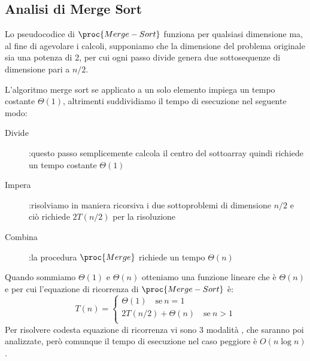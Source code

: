 \subsection{Analisi di Merge Sort}
Lo pseudocodice di $\proc{Merge-Sort}$ funziona per qualsiasi dimensione ma, al fine
di agevolare i calcoli, supponiamo che la dimensione del problema originale sia una
potenza di 2, per cui ogni passo divide genera due sottosequenze di dimensione pari a $n/2$.

L'algoritmo merge sort se applicato a un solo elemento impiega un tempo costante $\Theta(1)$,
altrimenti suddividiamo il tempo di esecuzione nel seguente modo:
\begin{description}
    \item[Divide]:questo passo semplicemente calcola il centro del sottoarray quindi
                  richiede un tempo costante $\Theta(1)$
    \item[Impera]:risolviamo in maniera ricorsiva i due sottoproblemi di dimensione $n/2$
                  e ciò richiede $2T(n/2)$ per la risoluzione
    \item[Combina]:la procedura $\proc{Merge}$ richiede un tempo $\Theta(n)$
\end{description}
Quando sommiamo $\Theta(1)$ e $\Theta(n)$ otteniamo una funzione lineare che è $\Theta(n)$
e per cui l'equazione di ricorrenza di $\proc{Merge-Sort}$ è:
\begin{equation*}
    T(n) = \begin{cases} \Theta(1) \quad \text{se} \ n = 1 \\
                         2T(n/2) + \Theta(n) \quad \text{se} \ n > 1 \\
           \end{cases}
\end{equation*}
Per risolvere codesta equazione di ricorrenza vi sono 3 modalità , che saranno poi analizzate,
però comunque il tempo di esecuzione nel caso peggiore è $O(n \log n)$.
